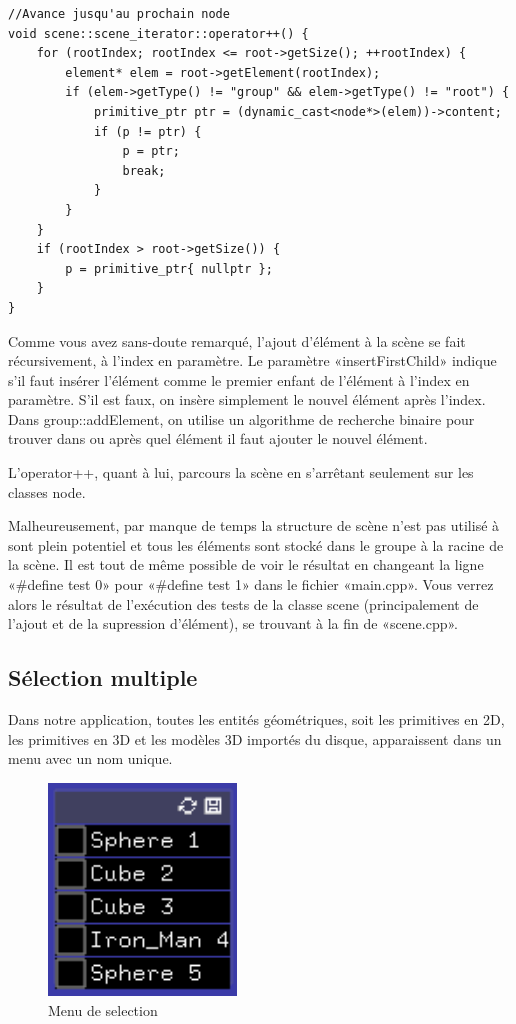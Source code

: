 \begin{lstlisting}
//Avance jusqu'au prochain node
void scene::scene_iterator::operator++() {
	for (rootIndex; rootIndex <= root->getSize(); ++rootIndex) {
		element* elem = root->getElement(rootIndex);
		if (elem->getType() != "group" && elem->getType() != "root") {
			primitive_ptr ptr = (dynamic_cast<node*>(elem))->content;
			if (p != ptr) {
				p = ptr;
				break;
			}
		}
	}
	if (rootIndex > root->getSize()) {
		p = primitive_ptr{ nullptr };
	}
}
\end{lstlisting}
Comme vous avez sans-doute remarqué, l'ajout d'élément à la scène se fait récursivement, à l'index en paramètre. Le paramètre «insertFirstChild» indique s'il faut insérer l'élément comme le premier enfant de l'élément à l'index en paramètre. S'il est faux, on insère simplement le nouvel élément après l'index. Dans group::addElement, on utilise un algorithme de recherche binaire pour trouver dans ou après quel élément il faut ajouter le nouvel élément.

L'operator++, quant à lui, parcours la scène en s'arrêtant seulement sur les classes node.  

Malheureusement, par manque de temps la structure de scène n'est pas utilisé à sont plein potentiel et tous les éléments sont stocké dans le groupe à la racine de la scène. Il est tout de même possible de voir le résultat en changeant la ligne «\#define test 0» pour «\#define test 1» dans le fichier «main.cpp». Vous verrez alors le résultat de l'exécution des tests de la classe scene (principalement de l'ajout et de la supression d'élément), se trouvant à la fin de «scene.cpp». 

\newpage

\subsection{Sélection multiple}

Dans notre application, toutes les entités géométriques, soit les primitives en 2D, les primitives en 3D et les modèles 3D importés du disque, apparaissent dans un menu avec un nom unique.

\begin{figure}[h]
	\centering
	\includegraphics[width=5cm]{fig/menuSelection.png}
	\caption{Menu de selection}
	\label{fig:test}
\end{figure}

